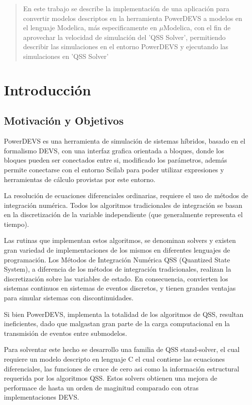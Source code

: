 \documentclass[a4paper,	11pt]{report}
\begin{document}
\tableofcontents

\begin{abstract}
En este trabajo se describe la implementación de una aplicación para convertir modelos descriptos en la herramienta PowerDEVS\cite{BK11} a modelos en el lenguaje Modelica\cite{Fritzson02modelica--}, más especificamente en $\mu$Modelica\cite{Ber12}, con el fin de aprovechar la velocidad de simulación del 'QSS Solver', permitiendo describir las simulaciones en el entorno PowerDEVS y ejecutando las simulaciones en 'QSS Solver'\cite{Fer12}
\end{abstract}


\chapter{Introducción}
\section{Motivación y Objetivos}
PowerDEVS\cite{BK11} es una herramienta de simulación de sistemas híbridos, basado en el formalismo DEVS\cite{Zeigler:2000:TMS:580780}, con una interfaz grafica orientada a bloques, donde los bloques pueden ser conectados entre si, modificado los parámetros, además permite conectarse con el entorno Scilab para poder utilizar expresiones y herramientas de cálculo provistas por este entorno.

La resolución de ecuaciones diferenciales ordinarias, requiere el uso de métodos de integración numérica. Todos los algoritmos tradicionales de integración se basan en la discretización de la variable independiente (que generalmente representa el tiempo).

Las rutinas que implementan estos algoritmos, se denominan solvers y existen gran variedad de implementaciones de los mismos en diferentes lenguajes de programación. Los Métodos de Integración Numérica QSS (Quantized State System), a diferencia de los métodos de integración tradicionales, realizan la discretización sobre las variables de estado. En consecuencia, convierten los sistemas continuos en sistemas de eventos discretos, y tienen grandes ventajas para simular sistemas con discontinuidades.

Si bien PowerDEVS, implementa la totalidad de los algoritmos de QSS, resultan ineficientes, dado que malgastan gran parte de la carga computacional en la transmisión de eventos entre submodelos.

Para solventar este hecho se desarrollo una familia de QSS stand-solver, el cual requiere un modelo descripto en lenguaje C el cual contiene las ecuaciones diferenciales, las funciones de cruce de cero asi como la información estructural requerida por los algoritmos QSS. Estos solvers obtienen una mejora de performace de hasta un orden de maginitud comparado con otras implementaciones DEVS.
\end{document}

